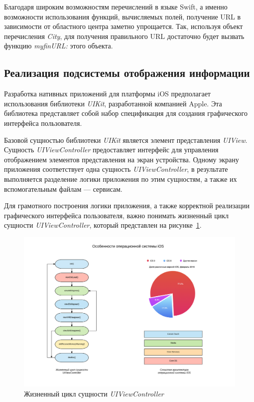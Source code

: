 Благодаря широким возможностям перечислений в языке Swift, а именно
возможности использования функций, вычисляемых полей, получение URL в
зависимости от областного центра заметно упрощается. Так, используя объект
перечисления \textit{City}, для получения правильного URL достаточно
будет вызвать функцию \textit{myfinURL:} этого объекта.



\subsection{Реализация подсистемы отображения информации}

Разработка нативных приложений для платформы iOS предполагает использования
библиотеки \textit{UIKit}, разработанной компанией Apple. Эта библиотека представляет
собой набор спецификация для создания графического интерфейса пользователя.

Базовой сущностью библиотеки \textit{UIKit} является элемент представления \textit{UIView}.
Сущность \textit{UIViewController} предоставляет интерфейс для управления отображением
элементов представления на экран устройства. Одному экрану приложения соответствует
одна сущность \textit{UIViewController}, в результате выполняется разделение
логики приложения по этим сущностям, а также их вспомогательным файлам --- сервисам.

Для грамотного построения логики приложения, а также корректной реализации графического
интерфейса пользователя, важно понимать жизненный цикл сущности \textit{UIViewController},
который представлен на рисунке~\ref{fig:vc_lifecycle}.
\begin{figure}[h!]
  \centering
  \includegraphics[width=120mm]{fig/vc_lifecycle}
  \caption{Жизненный цикл сущности \textit{UIViewController}}
  \label{fig:vc_lifecycle}
\end{figure}

